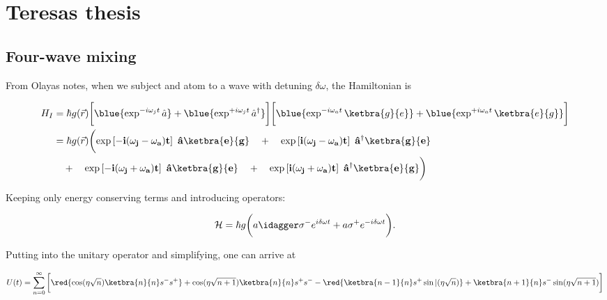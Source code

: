 
\newpage\section{Teresas thesis}
\subsection{Four-wave mixing}
From Olayas notes, when we subject  and atom to a wave with
detuning $ \delta\omega $, the Hamiltonian is
  
\begin{equation}
  \begin{aligned}
    H_I & = \hbar g(\vec{r})\bigg[\blue{\exp^{-i\omega_jt}\hat{a}}+\blue{\exp^{+i\omega_jt}\hat{a}^\dagger}\bigg]\bigg[\blue{\exp^{-i\omega_at}\ketbra{g}{e}}+\blue{\exp^{+i\omega_at}\ketbra{e}{g}}\bigg] \\
    & = \hbar g(\vec{r})\bigg(\mathbf{\exp\left[-i(\omega_j-\omega_a)t\right]\ \hat{a}\ketbra{e}{g}} \quad + \quad \mathbf{\exp\left[i(\omega_j-\omega_a)t\right]\ \hat{a}^\dagger\ketbra{g}{e}} \\
    &   \quad    +   \quad   \mathbf{\exp\left[-i(\omega_j+\omega_a)t\right]\
      \hat{a}\ketbra{g}{e}}          \quad         +          \quad
    \mathbf{\exp\left[i(\omega_j+\omega_a)t\right]\
      \hat{a}^\dagger\ketbra{e}{g}}\bigg)
  \end{aligned}
  \label{eqn:fullHamiltonianLightAtom}
\end{equation}
  
\noindent   Keeping  only   energy  conserving   terms  and
introducing operators:
  
  \begin{equation}\label{key}
    \mathcal{H} = \hbar g\bigg(a\idagger\sigma^{-} e^{i\delta\omega t} + a\sigma^{+} e^{-i\delta\omega t}\bigg).
  \end{equation}
  
  \noindent   Putting  into   the   unitary  operator   and
  simplifying, one can arrive at
  
  {\footnotesize\begin{equation}\label{eqn:teresa_1} U(t) =
      \sum_{n=0}^{\infty}\bigg[\red{\cos(\eta\sqrt{n})\ketbra{n}{n}s^{-}s^{+}}
      +     {\cos(\eta\sqrt{n+1})\ketbra{n}{n}s^{+}s^{-}}    -
      \red{\ketbra{n-1}{n}s^{+}\sin|(\eta\sqrt{n})}+\ketbra{n+1}{n}s^{-}\sin(\eta\sqrt{n+1})\bigg]
    \end{equation}}
  
